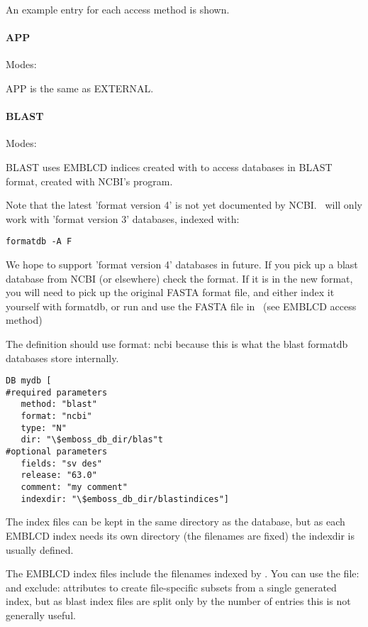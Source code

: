 \documentclass{report}
\begin{document}
An example entry for each access method is shown.

\paragraph{APP}\par\noindent
Modes: \par\noindent
APP is the same as EXTERNAL.

\paragraph{BLAST}\par\noindent
Modes:  \par\noindent BLAST uses EMBLCD indices created
with  to access databases in BLAST format, created
with NCBI's  program.

Note that the latest 'format version 4' is not yet documented by
NCBI. \EMBOSS\ will only work with 'format version 3' databases, indexed
with:

\begin{verbatim}
formatdb -A F
\end{verbatim}

We hope to support 'format version 4' databases in future. If you pick
up a blast database from NCBI (or elsewhere) check the format. If it
is in the new format, you will need to pick up the original FASTA
format file, and either index it yourself with formatdb, or run
 and use the FASTA file in \EMBOSS\ (see EMBLCD
access method)

The definition should use format: ncbi because this is what the blast
formatdb databases store internally.

\begin{verbatim}
DB mydb [
#required parameters
   method: "blast"
   format: "ncbi"
   type: "N"
   dir: "\$emboss_db_dir/blas"t
#optional parameters
   fields: "sv des"
   release: "63.0"
   comment: "my comment"
   indexdir: "\$emboss_db_dir/blastindices"]
\end{verbatim}

The index files can be kept in the same directory as the database, but
as each EMBLCD index needs its own directory (the filenames are fixed)
the indexdir is usually defined.

The EMBLCD index files include the filenames indexed by
. You can use the file: and exclude: attributes to
create file-specific subsets from a single  generated
index, but as blast index files are split only by the number of
entries this is not generally useful.
\end{document}
